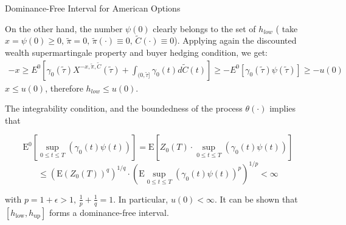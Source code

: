 \documentclass{beamer}
\begin{document}
\begin{frame}{Dominance-Free Interval for American Options}

    {\footnotesize \footnotesize
     On the other hand, the number \( \psi(0) \) clearly belongs to the set of $h_{low}$ ( 
     take \( x = \psi(0) \geq 0, \, \tilde{\pi} = 0, 
     \, \tilde{\pi}(\cdot) \equiv 0, \, \tilde{C}(\cdot) \equiv 0 \)). 
     \vspace{1em}
     Applying again the discounted wealth supermartingale property and buyer hedging condition, we get:
     \begin{align*}
        -x \geq E^0 \left[ \gamma_0(\tilde{\tau})X^{-x,\tilde{\pi},\tilde{C}}(\tilde{\tau}) + \int_{(0,\tilde{\tau}]} 
        \gamma_0(t)d\tilde{C}(t) \right] \geq -E^0[\gamma_0(\tilde{\tau})\psi(\tilde{\tau})] \geq -u(0)
     \end{align*}
     $x \leq  u(0)$, therefore $h_{low} \leq u(0)$.
    
      \pause The integrability condition, and the boundedness of the process \( \theta(\cdot) \) implies that  

\[
\text{E}^0 \left[ \sup_{0 \leq t \leq T} (\gamma_0(t)\psi(t)) \right] = \text{E} \left[ Z_0(T) \cdot \sup_{0 \leq t \leq T} (\gamma_0(t)\psi(t)) \right]
\]
\[
\leq (\text{E}(Z_0(T))^q)^{1/q} \cdot \left( \text{E} \sup_{0 \leq t \leq T} (\gamma_0(t)\psi(t))^p \right)^{1/p} < \infty
\]

with \( p = 1 + \epsilon > 1, \, \frac{1}{p} + \frac{1}{q} = 1 \). In particular, $u(0) < \infty$. 
It can be shown that \( [h_{\text{low}}, h_{\text{up}}] \) forms a dominance-free interval.
    }
\end{frame} 
\end{document}
